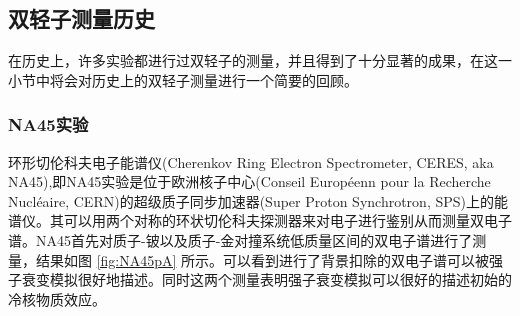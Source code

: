 \subsection{双轻子测量历史}

在历史上，许多实验都进行过双轻子的测量，并且得到了十分显著的成果，在这一小节中将会对历史上的双轻子测量进行一个简要的回顾。

\subsubsection{NA45实验}
环形切伦科夫电子能谱仪(Cherenkov Ring Electron Spectrometer, CERES, aka NA45),即NA45实验是位于欧洲核子中心(Conseil Européenn pour la Recherche Nucléaire, CERN)的超级质子同步加速器(Super Proton Synchrotron, SPS)上的能谱仪。其可以用两个对称的环状切伦科夫探测器来对电子进行鉴别从而测量双电子谱。NA45首先对质子-铍以及质子-金对撞系统低质量区间的双电子谱进行了测量，结果如图 \ref{fig:NA45pA} 所示。可以看到进行了背景扣除的双电子谱可以被强子衰变模拟很好地描述。同时这两个测量表明强子衰变模拟可以很好的描述初始的冷核物质效应。


